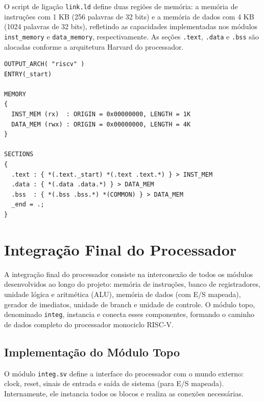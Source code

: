 \documentclass[
	12pt,				%
	oneside,
	a4paper,			%
	english,			%
	french,				%
	spanish,			%
	brazil,				%
	]{abntex2}
\begin{document}
O script de ligação \texttt{link.ld} define duas regiões de memória: a memória de instruções com 1 KB (256 palavras de 32 bits) e a memória de dados com 4 KB (1024 palavras de 32 bits), refletindo as capacidades implementadas nos módulos \texttt{inst\_memory} e \texttt{data\_memory}, respectivamente. As seções \texttt{.text}, \texttt{.data} e \texttt{.bss} são alocadas conforme a arquitetura Harvard do processador.

\begin{lstlisting}[caption={Script de ligação link.ld atualizado}, label={lst:link_ld}]
OUTPUT_ARCH( "riscv" )
ENTRY(_start)

MEMORY
{
  INST_MEM (rx)  : ORIGIN = 0x00000000, LENGTH = 1K
  DATA_MEM (rwx) : ORIGIN = 0x00000000, LENGTH = 4K
}

SECTIONS
{
  .text : { *(.text._start) *(.text .text.*) } > INST_MEM
  .data : { *(.data .data.*) } > DATA_MEM
  .bss  : { *(.bss .bss.*) *(COMMON) } > DATA_MEM
  _end = .;
}
\end{lstlisting}

\section{Integração Final do Processador}

A integração final do processador consiste na interconexão de todos os módulos desenvolvidos ao longo do projeto: memória de instruções, banco de registradores, unidade lógica e aritmética (ALU), memória de dados (com E/S mapeada), gerador de imediatos, unidade de branch e unidade de controle. O módulo topo, denominado \texttt{integ}, instancia e conecta esses componentes, formando o caminho de dados completo do processador monociclo RISC-V.

\subsection{Implementação do Módulo Topo}

O módulo \texttt{integ.sv} define a interface do processador com o mundo externo: clock, reset, sinais de entrada e saída de sistema (para E/S mapeada). Internamente, ele instancia todos os blocos e realiza as conexões necessárias.
\end{document}
